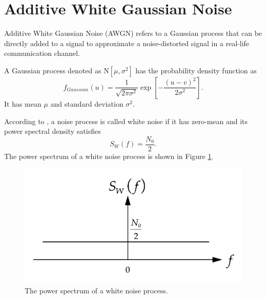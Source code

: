 \documentclass[../ECE459FinalProjectReport.tex]{subfiles}
\begin{document}
\section{Additive White Gaussian Noise}
Additive White Gaussian Noise (AWGN) refers to a Gaussian process that can be directly added to a signal to approximate a noise-distorted signal in a real-life communication channel.

A Gaussian process denoted as $\mathrm{N}\left[ \mu, \sigma^2 \right]$ has the probability density function as
\begin{equation}
    f_{Gaussian}\left(u\right) = \frac{1}{\sqrt{2\pi\sigma^2}}\exp\left[ -\frac{\left(u-v\right)^2}{2\sigma^2} \right].
\end{equation}
It has mean $\mu$ and standard deviation $\sigma^2$.

According to \cite[Sec. 8.10]{haykinIntroductionAnalogDigital2007}, a noise process is called white noise if it has zero-mean and its power spectral density satisfies
\begin{equation}
    S_W\left(f\right) = \frac{N_0}{2}.
\end{equation}
The power spectrum of a white noise process is shown in Figure \ref{fig:white-noise-spectrum}.
\begin{figure}[tb]
    \centering
    \includegraphics[scale=0.35]{plots/white-noise-power-spectrum.pdf}
    \caption{The power spectrum of a white noise process.}
    \label{fig:white-noise-spectrum}
\end{figure}
\end{document}
